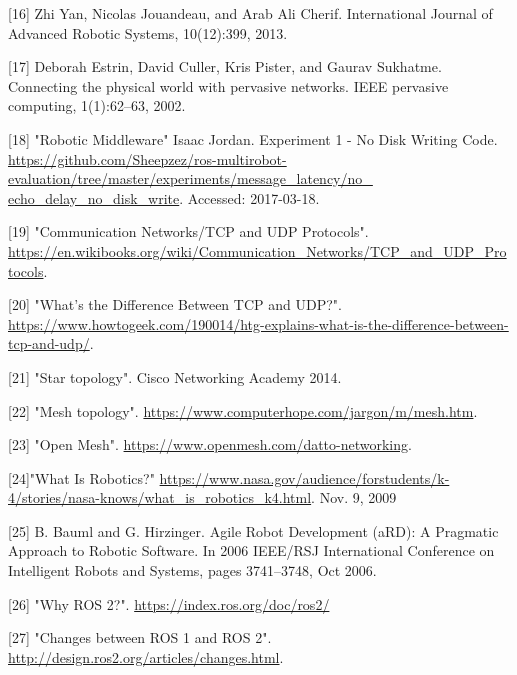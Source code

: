 \documentclass{mproj}
\begin{document}
[16] Zhi Yan, Nicolas Jouandeau, and Arab Ali Cherif. International Journal of Advanced Robotic Systems, 10(12):399, 2013.

[17] Deborah Estrin, David Culler, Kris Pister, and Gaurav Sukhatme. Connecting the physical world with pervasive networks. IEEE pervasive computing, 1(1):62–63, 2002.

[18] "Robotic Middleware" Isaac Jordan. Experiment 1 - No Disk Writing Code. \url{https://github.com/Sheepzez/ros-multirobot-evaluation/tree/master/experiments/message_latency/no_ echo_delay_no_disk_write}. Accessed: 2017-03-18.

[19] "Communication Networks/TCP and UDP Protocols". \url{https://en.wikibooks.org/wiki/Communication_Networks/TCP_and_UDP_Protocols}.

[20] "What’s the Difference Between TCP and UDP?". \url{https://www.howtogeek.com/190014/htg-explains-what-is-the-difference-between-tcp-and-udp/}.

[21] "Star topology". Cisco Networking Academy 2014.

[22] "Mesh topology". \url{https://www.computerhope.com/jargon/m/mesh.htm}.

[23] "Open Mesh". \url{https://www.openmesh.com/datto-networking}.

[24]"What Is Robotics?" \url{https://www.nasa.gov/audience/forstudents/k-4/stories/nasa-knows/what_is_robotics_k4.html}. Nov. 9, 2009

[25] B. Bauml and G. Hirzinger. Agile Robot Development (aRD): A Pragmatic Approach to Robotic Software. In 2006 IEEE/RSJ International Conference on Intelligent Robots and Systems, pages 3741–3748, Oct 2006.

[26] "Why ROS 2?".  \url{https://index.ros.org/doc/ros2/}

[27] "Changes between ROS 1 and ROS 2". \url{http://design.ros2.org/articles/changes.html}.
\end{document}
